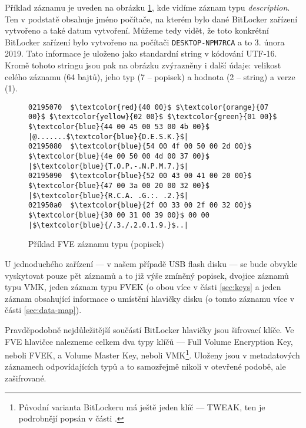 
Příklad  záznamu je uveden na obrázku \ref{fig:fve-entry-desc}, kde vidíme záznam typu \emph{description}. Ten v podstatě obsahuje jméno počítače, na kterém bylo dané BitLocker zařízení vytvořeno a také datum vytvoření. Můžeme tedy vidět, že toto konkrétní BitLocker zařízení bylo vytvořeno na počítači \texttt{DESKTOP-NPM7RCA} a to 3. února 2019. Tato informace je uloženo jako standardní string v kódování UTF-16. Kromě tohoto stringu jsou pak na obrázku zvýrazněny i další údaje: velikost celého záznamu (64 bajtů), jeho typ (7 -- popisek) a hodnota (2 -- string) a verze (1).


\begin{figure}[h]
		\centering
		\captionsetup{width=0.65\linewidth}
\begin{lstlisting}[frame=none, escapechar=$, basicstyle=\ttfamily\small, columns=fullflexible, keepspaces=true]
02195070  $\textcolor{red}{40 00}$ $\textcolor{orange}{07 00}$ $\textcolor{yellow}{02 00}$ $\textcolor{green}{01 00}$  $\textcolor{blue}{44 00 45 00 53 00 4b 00}$ |@.......$\textcolor{blue}{D.E.S.K.}$|
02195080  $\textcolor{blue}{54 00 4f 00 50 00 2d 00}$  $\textcolor{blue}{4e 00 50 00 4d 00 37 00}$ |$\textcolor{blue}{T.O.P.-.N.P.M.7.}$|
02195090  $\textcolor{blue}{52 00 43 00 41 00 20 00}$  $\textcolor{blue}{47 00 3a 00 20 00 32 00}$ |$\textcolor{blue}{R.C.A. .G.:. .2.}$|
021950a0  $\textcolor{blue}{2f 00 33 00 2f 00 32 00}$  $\textcolor{blue}{30 00 31 00 39 00}$ 00 00 |$\textcolor{blue}{/.3./.2.0.1.9.}$..|
\end{lstlisting}
		\caption{Příklad FVE záznamu typu  (popisek)}
		\label{fig:fve-entry-desc}
\end{figure}

U jednoduchého zařízení --- v našem případě USB flash disku --- se bude obvykle vyskytovat pouze pět záznamů a to již výše zmíněný popisek, dvojice záznamů typu VMK, jeden záznam typu FVEK (o obou více v části \ref{sec:keys} a jeden záznam obsahující informace o umístění hlavičky disku (o tomto záznamu více v části \ref{sec:data-map}).

\label{sec:keys}

Pravděpodobně nejdůležitější součástí BitLocker hlavičky jsou šifrovací klíče. Ve FVE hlavičce nalezneme celkem dva typy klíčů --- Full Volume Encryption Key, neboli FVEK, a Volume Master Key, neboli VMK\footnote{Původní varianta BitLockeru má ještě jeden klíč --- TWEAK, ten je podrobnějí popsán v části .}. Uloženy jsou v metadatových záznamech odpovídajících typů a to samozřejmě nikoli v otevřené podobě, ale zašifrované.

